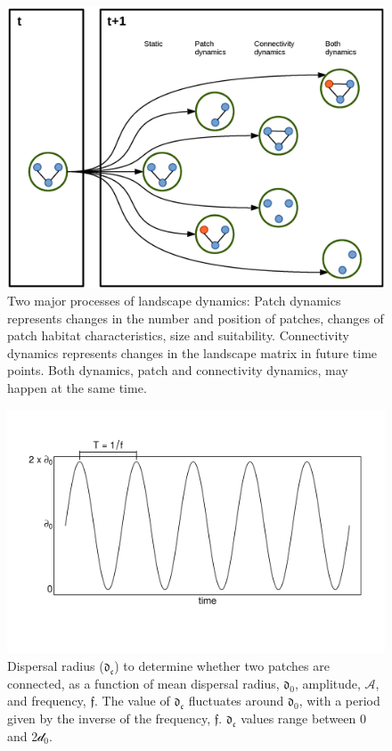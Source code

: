 \documentclass[a4paper,12pt]{article}
\begin{document}
\begin{figure}[hb!]
\begin{center}
\includegraphics[width=\textwidth]{newfigures/landscapedynamics.eps}
\caption{Two major processes of landscape dynamics: Patch dynamics represents changes in the number and position of patches, changes of patch habitat characteristics, size and suitability. Connectivity dynamics represents changes in the landscape matrix in future time points. Both dynamics, patch and connectivity dynamics, may happen at the same time.}
\end{center}
\label{fig:Figure1}
\end{figure}

\begin{figure}[hb!]
\begin{center}
\includegraphics[width=\textwidth]{./newfigures/criticalradius_definition.png}
\caption{Dispersal radius ($\mathfrak{d_{c}}$) to determine whether two patches are connected, as a function of mean dispersal radius, $\mathfrak{d_{0}}$, amplitude, $\mathcal{A}$, and frequency, $\mathfrak{f}$. The value of $\mathfrak{d_{c}}$ fluctuates around $\mathfrak{d_{0}}$, with a period given by the inverse of the frequency, $\mathfrak{f}$. $\mathfrak{d_{c}}$ values range between 0 and 2$\mathcal{d_{0}}$.}
\end{center}
\label{fig:Figure2}
\end{figure}
\end{document}
